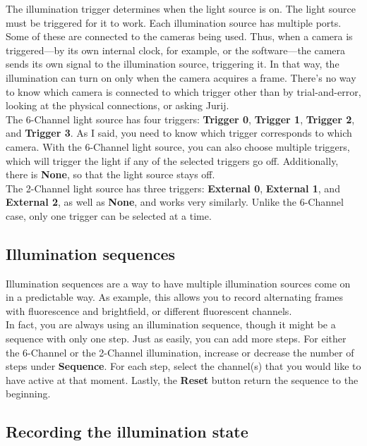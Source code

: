 \documentclass{article}
\begin{document}
The illumination trigger determines when the light source is on. The light source must be triggered for it to work. Each illumination source has multiple ports. Some of these are connected to the cameras being used. Thus, when a camera is triggered---by its own internal clock, for example, or the software---the camera sends its own signal to the illumination source, triggering it. In that way, the illumination can turn on only when the camera acquires a frame. There's no way to know which camera is connected to which trigger other than by trial-and-error, looking at the physical connections, or asking Jurij. \\

The 6-Channel light source has four triggers: \textbf{Trigger 0}, \textbf{Trigger 1}, \textbf{Trigger 2}, and \textbf{Trigger 3}. As I said, you need to know which trigger corresponds to which camera. With the 6-Channel light source, you can also choose multiple triggers, which will trigger the light if any of the selected triggers go off. Additionally, there is \textbf{None}, so that the light source stays off.\\

The 2-Channel light source has three triggers: \textbf{External 0}, \textbf{External 1}, and \textbf{External 2}, as well as \textbf{None}, and works very similarly. Unlike the 6-Channel case, only one trigger can be selected at a time.

\newpage

\subsection{Illumination sequences}

Illumination sequences are a way to have multiple illumination sources come on in a predictable way. As example, this allows you to record alternating frames with fluorescence and brightfield, or different fluorescent channels.\\

In fact, you are always using an illumination sequence, though it might be a sequence with only one step. Just as easily, you can add more steps. For either the 6-Channel or the 2-Channel illumination, increase or decrease the number of steps under \textbf{Sequence}. For each step, select the channel(s) that you would like to have active at that moment. Lastly, the \textbf{Reset} button return the sequence to the beginning.\\

\subsection{Recording the illumination state}
\end{document}
